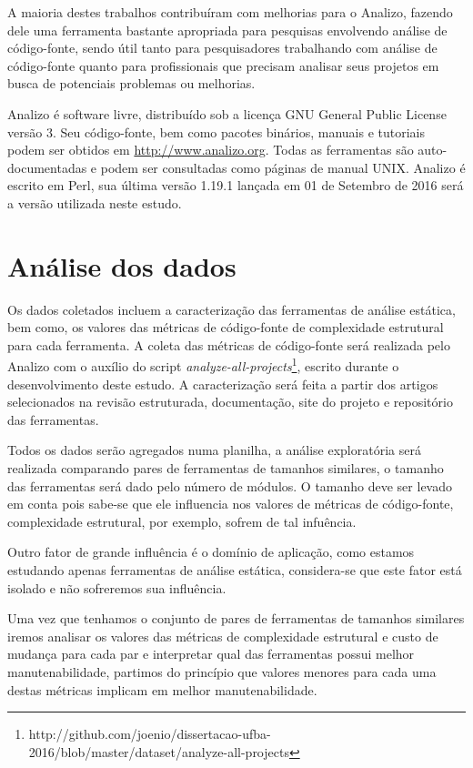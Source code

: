 A maioria destes trabalhos contribuíram com melhorias para o Analizo, fazendo
dele uma ferramenta bastante apropriada para pesquisas envolvendo análise de código-fonte,
sendo útil tanto para pesquisadores trabalhando com análise de código-fonte
quanto para profissionais que precisam analisar seus projetos em busca de
potenciais problemas ou melhorias.

Analizo é software livre, distribuído sob a licença GNU General Public License
versão 3. Seu código-fonte, bem como pacotes binários, manuais e tutoriais
podem ser obtidos em \url{http://www.analizo.org}. Todas as ferramentas são
auto-documentadas e podem ser consultadas como páginas de manual UNIX. Analizo
é escrito em Perl, sua última versão 1.19.1 lançada em 01 de Setembro de 2016
será a versão utilizada neste estudo.

\section{Análise dos dados} \label{analise}

Os dados coletados incluem a caracterização das ferramentas de análise
estática, bem como, os valores das métricas de código-fonte de complexidade
estrutural para cada ferramenta. A coleta das métricas de
código-fonte será realizada pelo Analizo com o auxílio do script {\em
analyze-all-projects}\footnote{http://github.com/joenio/dissertacao-ufba-2016/blob/master/dataset/analyze-all-projects},
escrito durante o desenvolvimento deste estudo. A caracterização será feita a
partir dos artigos selecionados na revisão estruturada, documentação, site do
projeto e repositório das ferramentas.

Todos os dados serão agregados numa planilha, a análise exploratória será
realizada comparando pares de ferramentas de tamanhos similares, o tamanho das
ferramentas será dado pelo número de módulos. O tamanho deve ser
levado em conta pois sabe-se que ele influencia nos valores de métricas de
código-fonte, complexidade estrutural, por exemplo, sofrem
de tal infuência.

Outro fator de grande influência é o domínio de aplicação, como estamos
estudando apenas ferramentas de análise estática, considera-se que este fator
está isolado e não sofreremos sua influência.

Uma vez que tenhamos o conjunto de pares de ferramentas de tamanhos similares
iremos analisar os valores das métricas de complexidade estrutural e custo de
mudança para cada par e interpretar qual das ferramentas possui melhor
manutenabilidade, partimos do princípio que valores menores para cada uma
destas métricas implicam em melhor manutenabilidade.


